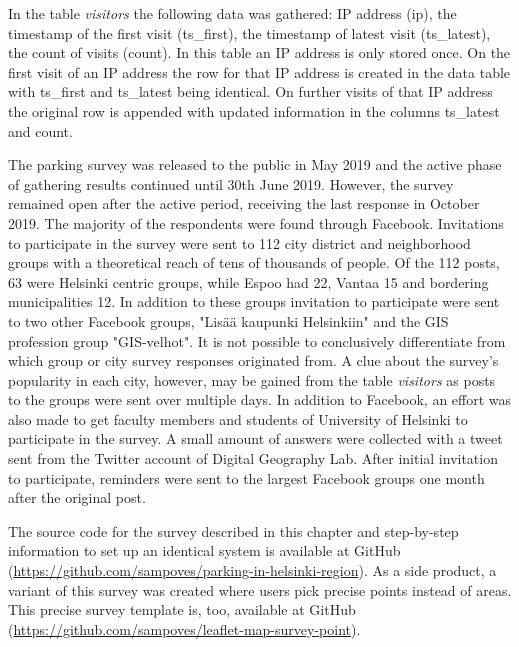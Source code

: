 In the table \textit{visitors} the following data was gathered: IP address (ip), the timestamp of the first visit (ts\_first), the timestamp of latest visit (ts\_latest), the count of visits (count). In this table an IP address is only stored once. On the first visit of an IP address the row for that IP address is created in the data table with ts\_first and ts\_latest being identical. On further visits of that IP address the original row is appended with updated information in the columns ts\_latest and count.

The parking survey was released to the public in May 2019 and the active phase of gathering results continued until 30th June 2019. However, the survey remained open after the active period, receiving the last response in October 2019. The majority of the respondents were found through Facebook. Invitations to participate in the survey were sent to 112 city district and neighborhood groups with a theoretical reach of tens of thousands of people. Of the 112 posts, 63 were Helsinki centric groups, while Espoo had 22, Vantaa 15 and bordering municipalities 12. In addition to these groups invitation to participate were sent to two other Facebook groups, "Lisää kaupunki Helsinkiin" and the GIS profession group "GIS-velhot". It is not possible to conclusively differentiate from which group or city survey responses originated from. A clue about the survey's popularity in each city, however, may be gained from the table \textit{visitors} as posts to the groups were sent over multiple days. In addition to Facebook, an effort was also made to get faculty members and students of University of Helsinki to participate in the survey. A small amount of answers were collected with a tweet sent from the Twitter account of Digital Geography Lab. After initial invitation to participate, reminders were sent to the largest Facebook groups one month after the original post.

The source code for the survey described in this chapter and step-by-step information to set up an identical system is available at GitHub (\textcolor{blue}{\url{https://github.com/sampoves/parking-in-helsinki-region}}). As a side product, a variant of this survey was created where users pick precise points instead of areas. This precise survey template is, too, available at GitHub (\textcolor{blue}{\url{https://github.com/sampoves/leaflet-map-survey-point}}).

